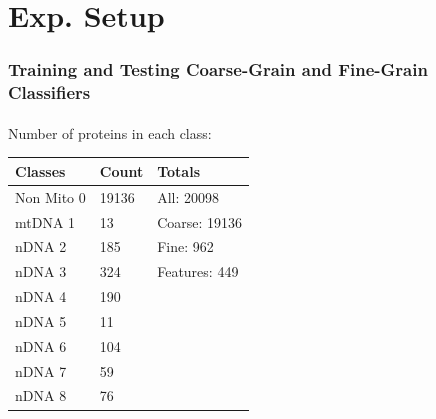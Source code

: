 \documentclass{beamer}
\begin{document}
\section{Exp. Setup}
\begin{frame}
    \frametitle{Training and Testing Coarse-Grain
    and Fine-Grain Classifiers}  %
    \framesubtitle{}
    \par Number of proteins in each class:
    \begin{table}[H]
      \centering
        \label{tab:ClassesAll}
      \begin{tabular}{|l|l||l|}\hline
        Classes & Count & Totals \\ \hline
       Non Mito 0 & 19136 & All: 20098 \\
       mtDNA 1 & 13 & Coarse: 19136 \\
       nDNA 2 & 185 & Fine: 962 \\
       nDNA 3 & 324 & Features: 449 \\
       nDNA 4 & 190 & \\
       nDNA 5 & 11 &  \\
       nDNA 6 & 104  & \\
       nDNA 7 & 59  & \\
       nDNA 8 & 76  & \\ \hline
      \end{tabular}%
    \end{table}
\end{frame}
\end{document}
